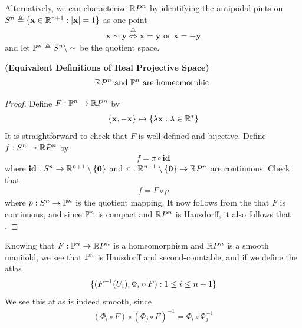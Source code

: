 \documentclass{report}
\begin{document}
\begin{mdframed}
Alternatively, we can characterize $\R P^n$ by identifying the antipodal pints on $S^n\triangleq \set{\textbf{x}\inr^{n+1}:\abso{\textbf{x}}=1}$ as one point 
\begin{align*}
\textbf{x}\sim \textbf{y}\overset{\triangle}{\iff } \textbf{x}=\textbf{y}\text{ or }\textbf{x}=-\textbf{y}
\end{align*}
and let $\P^n\triangleq S^n\setminus \sim $ be the quotient space.
\end{mdframed}
\begin{theorem}
\label{RPnhom}
\textbf{(Equivalent Definitions of Real Projective Space)} 
\begin{align*}
\RP^n\text{ and }\P^n\text{ are homeomorphic }
\end{align*}
\end{theorem}
\begin{proof}
Define $F:\P^n\rightarrow \RP^n$ by 
\begin{align*}
\set{\textbf{x},-\textbf{x}}\mapsto \set{\ld  \textbf{x}:\ld \inr^*}
\end{align*}
It is straightforward to check that $F$ is well-defined and bijective. Define $f:S^n \rightarrow \R P^n$ by 
\begin{align*}
f= \pi \circ \textbf{id}
\end{align*}
where $\textbf{id}:S^n \rightarrow \R^{n+1}\setminus \set{\textbf{0}}$ and $\pi:\R^{n+1}\setminus \set{\textbf{0}}\rightarrow \R P^n$ are continuous. Check that  
\begin{align*}
f=F\circ p
\end{align*}
where $p:S^n\rightarrow \P^n$ is the quotient mapping. It now follows from the  that $F$ is continuous, and since $\P^n$ is compact and  $\R P^n$ is Hausdorff,  it also follows that  . 
\end{proof}
\begin{mdframed}
Knowing that $F:\P^n\rightarrow \RP^n$ is a homeomorphism and $\RP^n$ is a smooth manifold, we see that  $\P^n$ is Hausdorff and second-countable, and if we define the atlas 
\begin{align*}
  \set{(F^{-1}(U_i), \Phi_i \circ F):1\leq i\leq n+1}
\end{align*}
We see this atlas is indeed smooth, since 
\begin{align*}
  (\Phi_i\circ F)\circ (\Phi_j \circ F)^{-1}=\Phi_i \circ \Phi_j^{-1}
\end{align*}
\end{mdframed}
\end{document}
